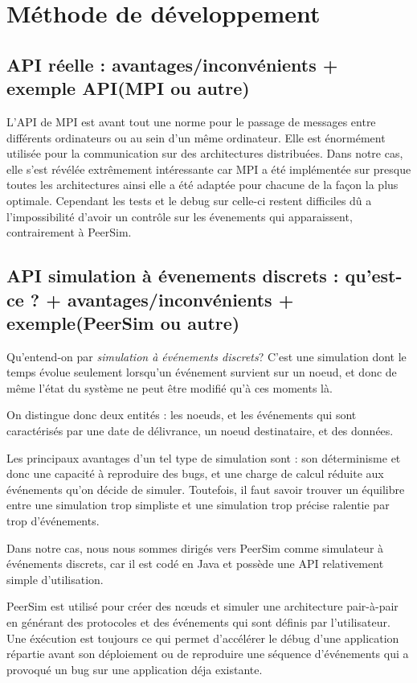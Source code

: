\documentclass{article}
\begin{document}
		\section{Méthode de développement}
			\subsection{API réelle : avantages/inconvénients + exemple API(MPI ou autre)}
			L'API de MPI est avant tout une norme pour le passage de messages entre différents ordinateurs ou au sein d'un même ordinateur.
			Elle est énormément utilisée pour la communication sur des architectures distribuées.
			Dans notre cas, elle s'est révélée extrêmement intéressante car MPI a été implémentée sur presque toutes les architectures ainsi elle 
			a été adaptée pour chacune de la façon la plus optimale. Cependant les tests et le debug sur celle-ci restent difficiles dû a l'impossibilité 
			d'avoir un contrôle sur les évenements qui apparaissent, contrairement à PeerSim.
			\newpage
			\subsection{API simulation à évenements discrets : qu'est-ce ? + avantages/inconvénients + exemple(PeerSim ou autre)}
				Qu'entend-on par \textit{simulation à événements discrets}? C'est une simulation dont le temps évolue seulement lorsqu'un événement survient sur un noeud, et donc de même l'état du système ne peut être modifié qu'à ces moments là.

				On distingue donc deux entités : les noeuds, et les événements qui sont caractérisés par une date de délivrance, un noeud destinataire, et des données.

				Les principaux avantages d'un tel type de simulation sont : son déterminisme et donc une capacité à reproduire des bugs, et une charge de calcul réduite aux événements qu'on décide de simuler. Toutefois, il faut savoir trouver un équilibre entre une simulation trop simpliste et une simulation trop précise ralentie par trop d'événements.

				Dans notre cas, nous nous sommes dirigés vers PeerSim comme simulateur à événements discrets, car il est codé en Java et possède une API relativement simple d'utilisation.

				PeerSim est utilisé pour créer des nœuds et simuler une architecture pair-à-pair en générant des protocoles et des événements qui sont définis par l'utilisateur. Une éxécution est toujours ce qui permet d'accélérer le débug d'une application répartie avant son déploiement ou de reproduire une séquence d'événements qui a provoqué un bug sur une application déja existante.
\end{document}
